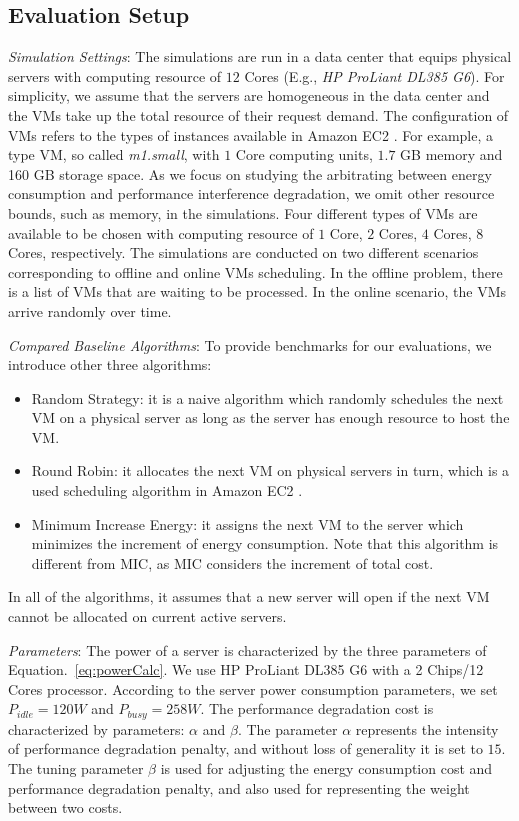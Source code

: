 \documentclass[10pt,journal]{IEEEtran}
\begin{document}
\subsection{Evaluation Setup}
\textit{Simulation Settings}: The simulations are run in a data center that equips physical servers with computing resource of $12$ Cores (E.g., \textit{HP ProLiant DL385 G6}). For simplicity, we assume that the servers are homogeneous in the data center and the VMs take up the total resource of their request demand. The configuration of VMs refers to the types of instances available in Amazon EC2 \cite{Amazon}. For example, a type VM, so called \textit{m1.small}, with $1$ Core computing units, $1.7$ GB memory and 160 GB storage space. As we focus on studying the arbitrating between energy consumption and performance interference degradation, we omit other resource bounds, such as memory, in the simulations. Four different types of VMs are available to be chosen with computing resource of $1$ Core, $2$ Cores, $4$ Cores, $8$ Cores, respectively. The simulations are conducted on two different scenarios corresponding to offline and online VMs scheduling. In the offline problem, there is a list of VMs that are waiting to be processed. In the online scenario, the VMs arrive randomly over time.

\textit{Compared Baseline Algorithms}: To provide benchmarks for our evaluations, we introduce other three algorithms:
\begin{itemize}
\item Random Strategy: it is a naive algorithm which randomly schedules the next VM on a physical server as long as the server has enough resource to host the VM.
\item Round Robin: it allocates the next VM on physical servers in turn, which is a used scheduling algorithm in Amazon EC2 \cite{Amazon}.
\item Minimum Increase Energy: it assigns the next VM to the server which minimizes the increment of energy consumption. Note that this algorithm is different from MIC, as MIC considers the increment of total cost. 
\end{itemize}

In all of the algorithms, it assumes that a new server will open if the next VM cannot be allocated on current active servers.

\textit{Parameters}: The power of a server is characterized by the three parameters of Equation.~\ref{eq:powerCalc}. We use HP ProLiant DL385 G6 with a 2 Chips/12 Cores processor. According to the server power consumption parameters, we set $P_{idle}=120W$ and $P_{busy}=258W$. The performance degradation cost is characterized by parameters: $\alpha$ and $\beta$. The parameter $\alpha$ represents the intensity of performance degradation penalty, and without loss of generality it is set to $15$. The tuning parameter $\beta$ is used for adjusting the energy consumption cost and performance degradation penalty, and also used for representing the weight between two costs.
\end{document}
